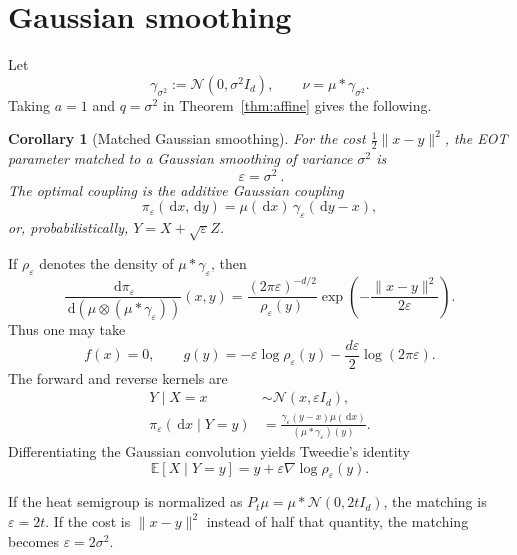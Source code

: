 \documentclass[11pt]{article}
\newtheorem{corollary}[theorem]{Corollary}
\theoremstyle{remark}
\newcommand{\E}{\mathbb{E}}
\newcommand{\N}{\mathcal{N}}
\newcommand{\dd}{\,\mathrm{d}}
\begin{document}
\section{Gaussian smoothing}

Let
\[
  \gamma_{\sigma^2}:=\N(0,\sigma^2I_d),
  \qquad \nu=\mu*\gamma_{\sigma^2}.
\]
Taking $a=1$ and $q=\sigma^2$ in Theorem~\ref{thm:affine} gives the following.

\begin{corollary}[Matched Gaussian smoothing]
  \label{cor:smoothing}
For the cost $\frac12\lVert x-y\rVert^2$, the EOT parameter matched to a
Gaussian smoothing of variance $\sigma^2$ is
\[
  \boxed{\ \varepsilon=\sigma^2\ }.
\]
The optimal coupling is the additive Gaussian coupling
\begin{equation}
  \label{eq:smoothing-coupling}
  \boxed{\quad
  \pi_\varepsilon(\dd x,\dd y)
  =\mu(\dd x)\,\gamma_\varepsilon(\dd y-x),
  \quad}
\end{equation}
or, probabilistically, $Y=X+\sqrt\varepsilon Z$.
\end{corollary}

If $\rho_\varepsilon$ denotes the density of
$\mu*\gamma_\varepsilon$, then
\begin{equation}
  \frac{\dd\pi_\varepsilon}
       {\dd(\mu\otimes(\mu*\gamma_\varepsilon))}(x,y)
  =\frac{(2\pi\varepsilon)^{-d/2}}{\rho_\varepsilon(y)}
   \exp\!\left(-\frac{\lVert x-y\rVert^2}{2\varepsilon}\right).
\end{equation}
Thus one may take
\begin{equation}
  f(x)=0,
  \qquad
  g(y)=-\varepsilon\log\rho_\varepsilon(y)
       -\frac{d\varepsilon}{2}\log(2\pi\varepsilon).
\end{equation}
The forward and reverse kernels are
\begin{align}
  Y\mid X=x&\sim\N(x,\varepsilon I_d),\\
  \pi_\varepsilon(\dd x\mid Y=y)
  &=\frac{\gamma_\varepsilon(y-x)\mu(\dd x)}
          {(\mu*\gamma_\varepsilon)(y)}.
\end{align}
Differentiating the Gaussian convolution yields Tweedie's identity
\begin{equation}
  \label{eq:tweedie-smoothing}
  \boxed{\quad
  \E[X\mid Y=y]
  =y+\varepsilon\nabla\log\rho_\varepsilon(y).
  \quad}
\end{equation}

If the heat semigroup is normalized as
$P_t\mu=\mu*\N(0,2tI_d)$, the matching is $\varepsilon=2t$.  If the cost is
$\lVert x-y\rVert^2$ instead of half that quantity, the matching becomes
$\varepsilon=2\sigma^2$.
\end{document}
